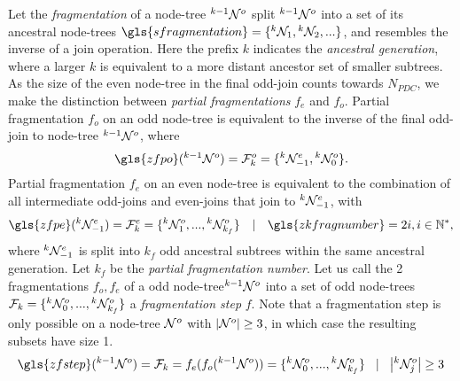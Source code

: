 \begin{definition}\label{def:fragmentation}
  Let the \emph{fragmentation} of a node-tree ${}^{k-1}\mathcal{N}^o$ split ${}^{k-1}\mathcal{N}^o$ into a set of its ancestral node-trees $\gls{sfragmentation} = \{\pre{k}\nset_1, \pre{k}\nset_2, ...\}$, and resembles the inverse of a join operation. Here the prefix $k$ indicates the \emph{ancestral generation}, where a larger $k$ is equivalent to a more distant ancestor set of smaller subtrees. As the size of the even node-tree in the final odd-join counts towards $N_{PDC}$, we make the distinction between \emph{partial fragmentations} $f_e$ and $f_o$. Partial fragmentation $f_o$ on an odd node-tree is equivalent to the inverse of the final odd-join to node-tree ${}^{k-1}\mathcal{N}^o$, where
  \begin{equation}\label{eq:pfe}
    \gls{zfpo}(\pre{k-1}\nset^o) = \m{F}^o_k = \{\pre{k}\nset^e_{-1}, \pre{k}\nset^o_0 \}.
  \end{equation}
  Partial fragmentation $f_e$ on an even node-tree is equivalent to the combination of all intermediate odd-joins and even-joins that join to ${}^{k}\mathcal{N}^e_{-1}$, with
  \begin{equation}\label{eq:pfo}
    \gls{zfpe}(\pre{k}\nset^e_{-1}) = \m{F}^e_k=\{\pre{k}\nset^{o}_1,...,\pre{k}\nset^o_{k_f}\} \hspace{1em} | \hspace{1em} \gls{zkfragnumber} = 2i, i \in \mathbb{N}^*,
  \end{equation}
  where ${}^{k}\mathcal{N}^e_{-1}$ is split into $k_f$ odd ancestral subtrees within the same ancestral generation. Let $k_f$ be the \emph{partial fragmentation number}. Let us call the 2 fragmentations $f_o, f_e$ of a odd node-tree${}^{k-1}\mathcal{N}^o$ into a set of odd node-trees $\mathcal{F}_k = \{{}^{k}\mathcal{N}^o_0,..., {}^{k}\mathcal{N}^{o}_{k_f}\}$ a \emph{fragmentation step} $f$. Note that a fragmentation step is only possible on a node-tree $\mathcal{N}^o$ with $|{\mathcal{N}^o}| \geq 3$, in which case the resulting subsets have size 1.
  \begin{equation}\label{eq:fstep}
    \gls{zfstep}(\pre{k-1}\nset^o) = \m{F}_k = f_e(f_o(\pre{k-1}\nset^o)) = \{\pre{k}\nset^o_0,...,\pre{k}\nset^{o}_{k_f}\} \hspace{.3cm} | \hspace{.3cm} \abs{{\pre{k}\nset^o_j}} \geq 3
  \end{equation}
\end{definition}



